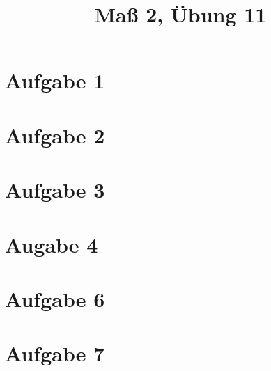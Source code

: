 \documentclass[]{article}
\author{}
\title{Maß 2, Übung 11}
\begin{document}
    \begin{titlepage}
        \maketitle
    \end{titlepage}
    
    \section{Aufgabe 1}
    
    \section{Aufgabe 2}
    
    \section{Aufgabe 3}
    
    \section{Augabe 4}
    
    \section{Aufgabe 6}
    
    \section{Aufgabe 7}
    
    
    
    
\end{document}
